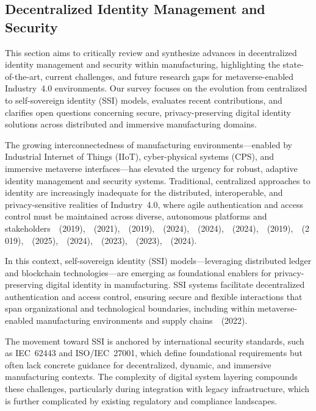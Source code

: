 \documentclass[sigconf]{acmart}
\begin{document}
\subsection{Decentralized Identity Management and Security}

This section aims to critically review and synthesize advances in decentralized identity management and security within manufacturing, highlighting the state-of-the-art, current challenges, and future research gaps for metaverse-enabled Industry~4.0 environments. Our survey focuses on the evolution from centralized to self-sovereign identity (SSI) models, evaluates recent contributions, and clarifies open questions concerning secure, privacy-preserving digital identity solutions across distributed and immersive manufacturing domains.

The growing interconnectedness of manufacturing environments—enabled by Industrial Internet of Things (IIoT), cyber-physical systems (CPS), and immersive metaverse interfaces—has elevated the urgency for robust, adaptive identity management and security systems. Traditional, centralized approaches to identity are increasingly inadequate for the distributed, interoperable, and privacy-sensitive realities of Industry~4.0, where agile authentication and access control must be maintained across diverse, autonomous platforms and stakeholders~\cite{ref16}~(2019),~\cite{ref17}~(2021),~\cite{ref18}~(2019),~\cite{ref19}~(2024),~\cite{ref20}~(2024),~\cite{ref27}~(2024),~\cite{ref29}~(2019),~\cite{ref30}~(2019),~\cite{ref37}~(2025),~\cite{ref38}~(2024),~\cite{ref42}~(2023),~\cite{ref43}~(2023),~\cite{ref44}~(2024).

In this context, self-sovereign identity (SSI) models—leveraging distributed ledger and blockchain technologies—are emerging as foundational enablers for privacy-preserving digital identity in manufacturing. SSI systems facilitate decentralized authentication and access control, ensuring secure and flexible interactions that span organizational and technological boundaries, including within metaverse-enabled manufacturing environments and supply chains~\cite{ref92}~(2022).

The movement toward SSI is anchored by international security standards, such as IEC~62443 and ISO/IEC~27001, which define foundational requirements but often lack concrete guidance for decentralized, dynamic, and immersive manufacturing contexts. The complexity of digital system layering compounds these challenges, particularly during integration with legacy infrastructure, which is further complicated by existing regulatory and compliance landscapes.
\end{document}
